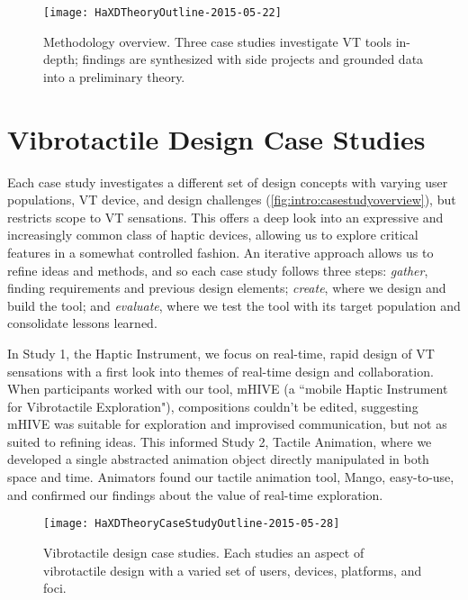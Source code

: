 \begin{figure}[htbp]
\begin{center}
\texttt{[image: HaXDTheoryOutline-2015-05-22]}
\caption{Methodology overview. Three case studies investigate VT tools in-depth; findings are synthesized with side projects and grounded data into a preliminary theory.}
\label{fig:intro:methodologyoverview}
\end{center}
\end{figure}


\section{Vibrotactile Design Case Studies}

Each case study investigates a different set of design concepts with varying user populations, VT device, and design challenges (\autoref{fig:intro:casestudyoverview}), but restricts scope to VT sensations.
This offers a deep look into an expressive and increasingly common class of haptic devices, allowing us to explore critical features in a somewhat controlled fashion.
An iterative approach allows us to refine ideas and methods, and so each case study follows three steps: \emph{gather}, finding requirements and previous design elements; \emph{create}, where we design and build the tool; and \emph{evaluate}, where we test the tool with its target population and consolidate lessons learned.

In Study 1, the Haptic Instrument, we focus on real-time, rapid design of VT sensations with a first look into themes of real-time design and collaboration.
When participants worked with our tool, mHIVE (a ``mobile Haptic Instrument for Vibrotactile Exploration"), compositions couldn't be edited, suggesting mHIVE was suitable for exploration and improvised communication, but not as suited to refining ideas.
This informed Study 2, Tactile Animation, where we developed a single abstracted animation object directly manipulated in both space and time.
Animators found our tactile animation tool, Mango, easy-to-use, and confirmed our findings about the value of real-time exploration.


\begin{figure}[htbp]
\begin{center}
\texttt{[image: HaXDTheoryCaseStudyOutline-2015-05-28]}
\caption{Vibrotactile design case studies. Each studies an aspect of vibrotactile design with a varied set of users, devices, platforms, and foci.}
\label{fig:intro:casestudyoverview}
\end{center}
\end{figure}


